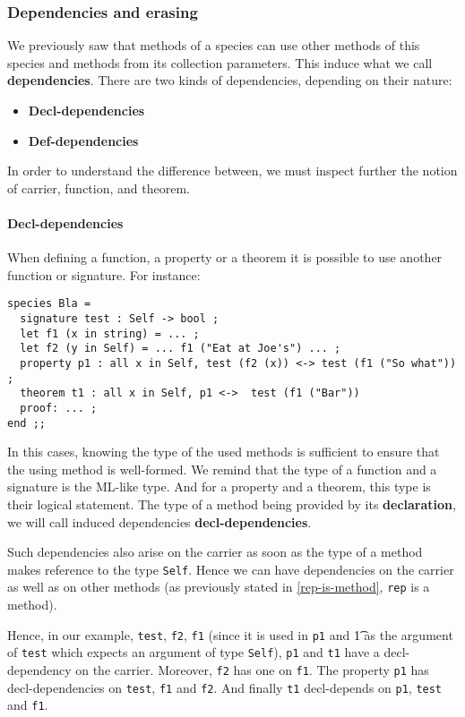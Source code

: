 \subsubsection{Dependencies and erasing}
We previously saw that methods of a species can use other methods of
this species and methods from its collection parameters. This induce
what we call {\bf dependencies}. There are two kinds
of dependencies, depending on their nature:
\begin{itemize}
  \item {\bf Decl-dependencies}
  \item {\bf Def-dependencies}
\end{itemize}
In order to understand the difference between, we must inspect further
the notion of carrier, function, and theorem.



\paragraph{Decl-dependencies}
When defining a function, a property or a theorem it is possible to
use another function or signature. For instance:
{\scriptsize
\begin{lstlisting}
species Bla =
  signature test : Self -> bool ;
  let f1 (x in string) = ... ;
  let f2 (y in Self) = ... f1 ("Eat at Joe's") ... ;
  property p1 : all x in Self, test (f2 (x)) <-> test (f1 ("So what")) ;
  theorem t1 : all x in Self, p1 <->  test (f1 ("Bar"))
  proof: ... ;
end ;;
\end{lstlisting}
}

In this cases, knowing the type of the used methods is sufficient to
ensure that the using method is well-formed. We remind that the type
of a function and a signature is the ML-like type. And for a property
and a theorem, this type is their logical statement. The type of a
method being provided by its {\bf declaration}, we will call induced
dependencies {\bf decl-dependencies}.

Such dependencies also arise on the carrier as soon as the type of a
method makes reference to the type {\tt Self}. Hence we can have
dependencies on the carrier as well as on other methods (as
previously stated in \ref{rep-is-method}, {\tt rep} is a method).

Hence, in our example, {\tt test}, {\tt f2}, {\tt f1} (since it is
used in {\tt p1} and {\t1} as the argument of {\tt test} which expects
an argument of type {\tt Self}), {\tt p1} and {\tt t1} have a
decl-dependency on the carrier. Moreover, {\tt f2} has one on
{\tt f1}. The property {\tt p1} has decl-dependencies on {\tt test},
{\tt f1} and {\tt f2}. And finally {\tt t1} decl-depends on {\tt p1},
{\tt test} and {\tt f1}.



